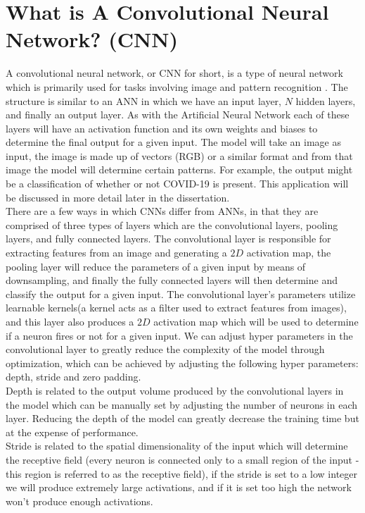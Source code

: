 \section{What is A Convolutional Neural Network? (CNN)}
A convolutional neural network, or CNN for short, is a type of neural network which is primarily used for tasks involving image and pattern recognition \cite{introToCnn}. The structure is similar to an ANN in which we have an input layer, $N$ hidden layers, and finally an output layer.  As with the Artificial Neural Network each of these layers will have an activation function and its own weights and biases to determine the final output for a given input. The model will take an image as input, the image is made up of vectors (RGB) or a similar format and from that image the model will determine certain patterns. For example, the output might be a classification of whether or not COVID-19 is present. This application will be discussed in more detail later in the dissertation. 
\\
There are a few ways in which CNNs differ from ANNs, in that they are comprised of three types of layers which are the convolutional layers, pooling layers, and fully connected layers\cite{introToCnn}.  The convolutional layer is responsible for extracting features from an image and generating a $2D$ activation map, the pooling layer will reduce the parameters of a given input by means of downsampling, and finally the fully connected layers will then determine and classify the output for a given input.  The convolutional layer's parameters utilize learnable kernels(a kernel acts as a filter used to extract features from images), and this layer also produces a $2D$ activation map which will be used to determine if a neuron fires or not for a given input.  We can adjust hyper parameters in the convolutional layer to greatly reduce the complexity of the model through optimization, which can be achieved by adjusting the following hyper parameters: depth, stride and zero padding.
\\
Depth is related to the output volume produced by the convolutional layers in the model which can be manually set by adjusting the number of neurons in each layer.  Reducing the depth of the model can greatly decrease the training time but at the expense of performance.
\\
Stride is related to the spatial dimensionality of the input which will determine the receptive field (every neuron is connected only to a small region of the input - this region is referred to as the receptive field\cite{introToCnn}), if the stride is set to a low integer we will produce extremely large activations, and if it is set too high the network won't produce enough activations.
